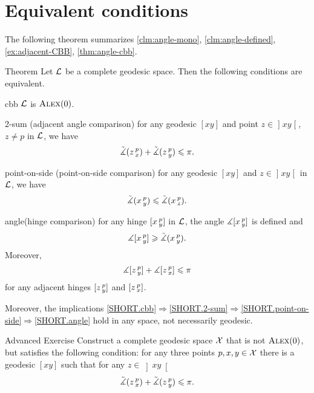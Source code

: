 \section{Equivalent conditions}

The following theorem summarizes \ref{clm:angle-mono}, \ref{clm:angle-defined}, \ref{ex:adjacent-CBB}, \ref{thm:angle-cbb}.

\begin{thm}{Theorem}\label{thm:defs_of_alex} 
Let $\mathcal{L}$ be a complete geodesic space.
Then the following conditions are equivalent.

\begin{subthm}{cbb}
$\mathcal{L}$ is $\textsc{Alex}(0)$.
\end{subthm}
 

\begin{subthm}{2-sum} 
(adjacent angle comparison) for any geodesic $[x y]$ and point $z\in \mathopen{]}x y\mathclose{[}$, $z\ne p$ in $\mathcal{L}$, we have
\[\tilde\measuredangle(z\,{}^{p}_{x})
+\tilde\measuredangle(z\,{}^{p}_{y})\leqslant \pi.\]
\end{subthm}

\begin{subthm}{point-on-side}
(point-on-side comparison)
for any geodesic $[x y]$ and $z\in \mathopen{]}x y\mathclose{[}$ in $\mathcal{L}$, we have
\[\tilde\measuredangle(x\,{}^{p}_{y})\leqslant\tilde\measuredangle(x\,{}^{p}_{z}).\]
\end{subthm}

\begin{subthm}{angle}(hinge comparison)
for any hinge $[x\,{}^{p}_{y}]$ in $\mathcal{L}$, the angle 
$\measuredangle[x\,{}^{p}_{y}]$ is defined and 
\[\measuredangle[x\,{}^{p}_{y}]\geqslant\tilde\measuredangle(x\,{}^{p}_{y}).\]
Moreover, 
\[\measuredangle[z\,{}^{p}_{y}] + \measuredangle[z\,{}^{p}_{x}]\leqslant\pi\]
for any adjacent hinges $[z\,{}^{p}_{y}]$ and $[z\,{}^{p}_{x}]$.
\end{subthm}

Moreover, the implications \ref{SHORT.cbb}$\Rightarrow$\ref{SHORT.2-sum}$\Rightarrow$\ref{SHORT.point-on-side}$\Rightarrow$\ref{SHORT.angle} hold in any space, not necessarily geodesic.
\end{thm}

\begin{thm}{Advanced Exercise}\label{ex:urysohn}
Construct a complete geodesic space $\mathcal{X}$ that is not $\textsc{Alex}(0)$, but satisfies the following condition: for any three points $p,x,y\in \mathcal{X}$ there is a geodesic $[x y]$ such that for any $z\in \left]x y\right[$
\[\tilde\measuredangle(z\,{}^{p}_{x})+\tilde\measuredangle(z\,{}^{p}_{y})
\leqslant
\pi.\]
\end{thm}

